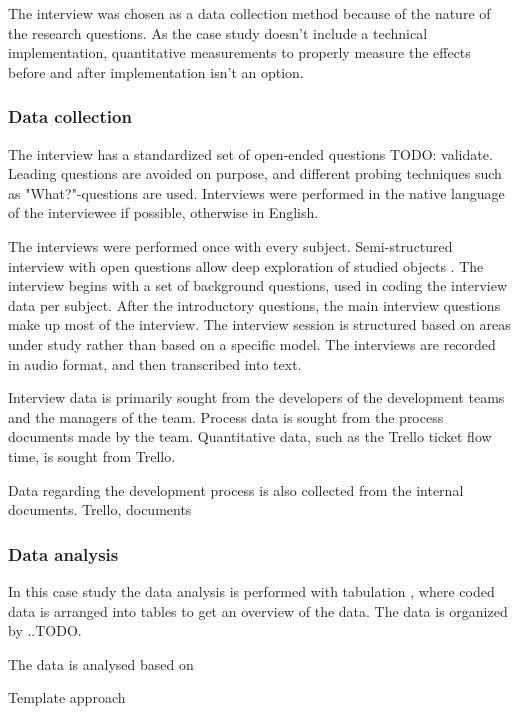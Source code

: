 \documentclass[english]{tktltiki2}
\theoremstyle{definition}
\theoremstyle{remark}
\begin{document}
The interview was chosen as a data collection method because of the nature of the research questions. As the case study doesn't include a technical implementation, quantitative measurements to properly measure the effects before and after implementation isn't an option. 

\subsubsection{Data collection}
The interview has a standardized set of open-ended questions TODO: validate. Leading questions are avoided on purpose, and different probing techniques such as "What?"-questions are used.    
Interviews were performed in the native language of the interviewee if possible, otherwise in English.

The interviews were performed once with every subject. Semi-structured interview with open questions allow deep exploration of studied objects \cite{runeson2009guidelines}. The interview begins with a set of background questions, used in coding the interview data per subject. After the introductory questions, the main interview questions make up most of the interview. The interview session is structured based on areas under study rather than based on a specific model. The interviews are recorded in audio format, and then transcribed into text.   

Interview data is primarily sought from the developers of the development teams and the managers of the team. Process data is sought from the process documents made by the team. Quantitative data, such as the Trello ticket flow time, is sought from Trello. 

Data regarding the development process is also collected from the internal documents.
Trello, documents


\subsubsection{Data analysis}
In this case study the data analysis is performed with tabulation \cite{runeson2009guidelines}, where coded data is arranged into tables to get an overview of the data. The data is organized by ..TODO.

The data is analysed based on 

Template approach %
\end{document}
